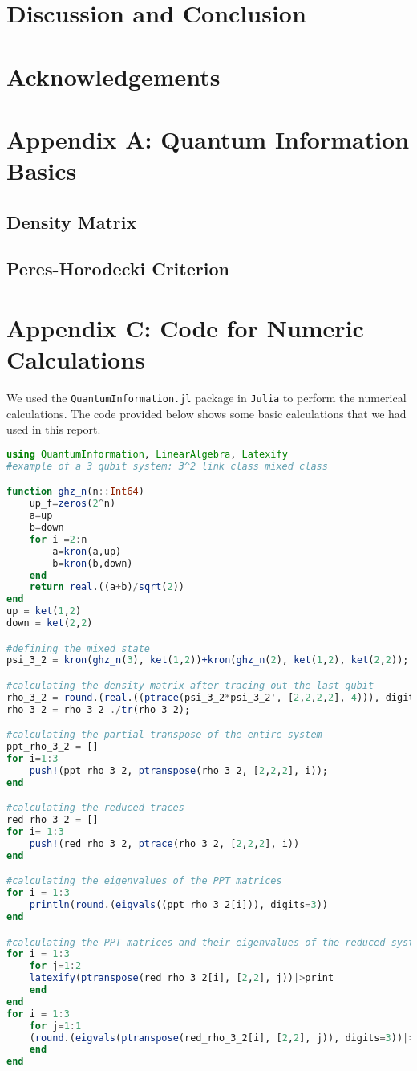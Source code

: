 \documentclass{scrartcl}
\begin{document}
\section{Discussion and Conclusion}
\section{Acknowledgements}
\newpage
\section*{Appendix A: {\huge Quantum Information Basics}}
\subsection{Density Matrix}
\subsection{Peres-Horodecki Criterion}
\newpage


\section*{Appendix C: {\huge Code for Numeric Calculations}}
We used the \texttt{QuantumInformation.jl} package in \texttt{Julia} to perform the numerical calculations. The code provided below shows some basic calculations that we had used in this report. 
\begin{lstlisting}[language=Julia,label={lst:transmission}]
using QuantumInformation, LinearAlgebra, Latexify 
#example of a 3 qubit system: 3^2 link class mixed class

function ghz_n(n::Int64)
    up_f=zeros(2^n)
    a=up
    b=down
    for i =2:n 
        a=kron(a,up)
        b=kron(b,down)
    end
    return real.((a+b)/sqrt(2))
end
up = ket(1,2)
down = ket(2,2)

#defining the mixed state 
psi_3_2 = kron(ghz_n(3), ket(1,2))+kron(ghz_n(2), ket(1,2), ket(2,2));

#calculating the density matrix after tracing out the last qubit
rho_3_2 = round.(real.((ptrace(psi_3_2*psi_3_2', [2,2,2,2], 4))), digits=3) 
rho_3_2 = rho_3_2 ./tr(rho_3_2);

#calculating the partial transpose of the entire system
ppt_rho_3_2 = []
for i=1:3
    push!(ppt_rho_3_2, ptranspose(rho_3_2, [2,2,2], i));
end

#calculating the reduced traces 
red_rho_3_2 = []
for i= 1:3
    push!(red_rho_3_2, ptrace(rho_3_2, [2,2,2], i))
end

#calculating the eigenvalues of the PPT matrices
for i = 1:3
    println(round.(eigvals((ppt_rho_3_2[i])), digits=3))
end

#calculating the PPT matrices and their eigenvalues of the reduced system
for i = 1:3
    for j=1:2
    latexify(ptranspose(red_rho_3_2[i], [2,2], j))|>print
    end
end
for i = 1:3
    for j=1:1
    (round.(eigvals(ptranspose(red_rho_3_2[i], [2,2], j)), digits=3))|>println
    end
end
\end{lstlisting}

\newpage

\end{document}
